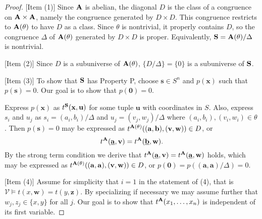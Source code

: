 \begin{proof}
  
  [Item (1)]
    Since ${{\mathbf{\uppercase{a}}}}$ is abelian, the diagonal 
  $D$ is the class of a congruence on ${{\mathbf{\uppercase{a}}}}\times {{\mathbf{\uppercase{a}}}}$,
  namely the congruence generated by $D\times D$. 
  This congruence restricts to ${{\mathbf{\uppercase{a}}}}(\theta)$ to have $D$ as a class.
  Since $\theta$ is nontrivial, it properly contains $D$,
  so the congruence $\Delta$ of
  ${{\mathbf{\uppercase{a}}}}(\theta)$ generated by $D\times D$ is proper. Equivalently, 
  ${{\mathbf{\uppercase{s}}}} = {{\mathbf{\uppercase{a}}}}(\theta)/\Delta$ is nontrivial.
  
\bigskip

  [Item (2)]
Since $D$ is a subuniverse of ${{\mathbf{\uppercase{a}}}}(\theta)$, $\{D/\Delta\}=\{0\}$
is a subuniverse of ${{\mathbf{\uppercase{s}}}}$.  

\bigskip

[Item (3)] To show that ${{\mathbf{\uppercase{s}}}}$ has Property P,
choose ${{\mathbf{{s}}}}\in S^n$ and $p({{\mathbf{{x}}}})$ such that $p({{\mathbf{{s}}}})=0$. Our goal
is to show that $p({{\mathbf{{0}}}}) = 0$.

Express $p({{\mathbf{{x}}}})$ as $t^{{{\mathbf{\uppercase{s}}}}}({{\mathbf{{x}}}},{{\mathbf{{u}}}})$
for some tuple ${{\mathbf{{u}}}}$ with coordinates in  $S$.
Also, express $s_i$ and $u_j$ 
as $s_i = (a_i,b_i)/\Delta$ and $u_j = (v_j,w_j)/\Delta$ where
$(a_i,b_i), (v_i,w_i)\in\theta$. Then $p({{\mathbf{{s}}}})=0$ may be expressed as
$t^{{{\mathbf{\uppercase{a}}}}(\theta)}(({{\mathbf{{a}}}},{{\mathbf{{b}}}}),({{\mathbf{{v}}}},{{\mathbf{{w}}}}))\in D$,
or 
\[
t^{{{\mathbf{\uppercase{a}}}}}(\underline{{{\mathbf{{a}}}}},{{\mathbf{{v}}}})=t^{{{\mathbf{\uppercase{a}}}}}(\underline{{{\mathbf{{b}}}}},{{\mathbf{{w}}}}).
\]
By the strong term condition we derive that
$t^{{{\mathbf{\uppercase{a}}}}}(\underline{{{\mathbf{{a}}}}},{{\mathbf{{v}}}})=t^{{{\mathbf{\uppercase{a}}}}}(\underline{{{\mathbf{{a}}}}},{{\mathbf{{w}}}})$
holds,
which may be expressed as
$t^{{{\mathbf{\uppercase{a}}}}(\theta)}(({{\mathbf{{a}}}},{{\mathbf{{a}}}}),({{\mathbf{{v}}}},{{\mathbf{{w}}}}))\in D$,
or $p({{\mathbf{{0}}}})=p(({{\mathbf{{a}}}},{{\mathbf{{a}}}})/\Delta)=0$.

\bigskip

[Item (4)]
Assume for simplicity that $i=1$ in the statement of (4),
that is ${\mathcal V}\models t(x,{{\mathbf{{w}}}})=t(y,{{\mathbf{{z}}}})$.
By specializing if necessary we may assume further
that $w_j, z_j\in\{x,y\}$ for all $j$. Our goal is to show that
$t^{{{\mathbf{\uppercase{a}}}}}(x_1,\ldots,x_n)$ is independent of its first variable.


\end{proof}
